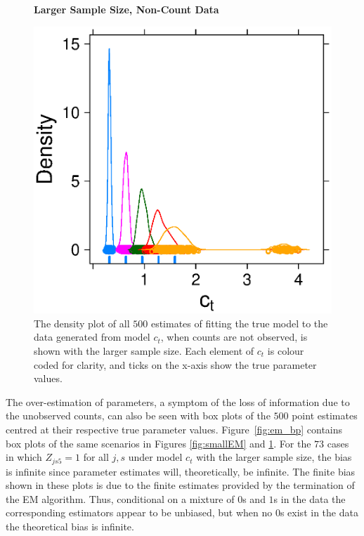 \documentclass[12pt]{article}
\begin{document}
\begin{figure}
  \textbf{Larger Sample Size, Non-Count Data}\par
  \centering
  \includegraphics[scale=0.75]{largerEM}
  \caption{The density plot of all $500$ estimates of fitting the true model to the data generated from model $c_t$, when counts are not observed, is shown with the larger sample size.  Each element of $c_t$ is colour coded for clarity, and ticks on the x-axis show the true parameter values.}
  \label{fig:largerEM}
\end{figure}

The over-estimation of parameters, a symptom of the loss of information due to the unobserved counts, can also be seen with box plots of the $500$ point estimates centred at their respective true parameter values.  Figure~\ref{fig:em_bp} contains box plots of the same scenarios in Figures \ref{fig:smallEM} and \ref{fig:largerEM}.  For the $73$ cases in which $Z_{js5} = 1$ for all $j,s$ under model $c_t$ with the larger sample size, the bias is infinite since parameter estimates will, theoretically, be infinite.  The finite bias shown in these plots is due to the finite estimates provided by the termination of the EM algorithm.  Thus, conditional on a mixture of $0$s and $1$s in the data the corresponding estimators appear to be unbiased, but when no $0$s exist in the data the theoretical bias is infinite.  
\end{document}
